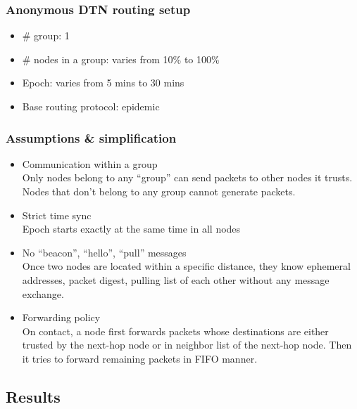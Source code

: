 \documentclass[11pt]{article}
\begin{document}
\subsubsection{Anonymous DTN routing setup}
\begin{itemize}
 \item \# group: 1
 \item \# nodes in a group: varies from 10\% to 100\%
 \item Epoch: varies from 5 mins to 30 mins
 \item Base routing protocol: epidemic
\end{itemize}



\subsubsection{Assumptions \& simplification}
\begin{itemize}
 \item Communication within a group\\
Only nodes belong to any ``group'' can send packets to other nodes it trusts. 
Nodes that don't belong to any group cannot generate packets.

 \item Strict time sync\\
Epoch starts exactly at the same time in all nodes

 \item No ``beacon'', ``hello'', ``pull'' messages\\
Once two nodes are located within a specific distance, they know ephemeral addresses, packet digest, pulling list of each other without any message exchange. 

 \item Forwarding policy\\
On contact, a node first forwards packets whose destinations are either trusted by the next-hop node or in neighbor list of the next-hop node.  Then it tries to forward remaining packets in FIFO manner. 
\end{itemize}


\subsection{Results}
\end{document}
